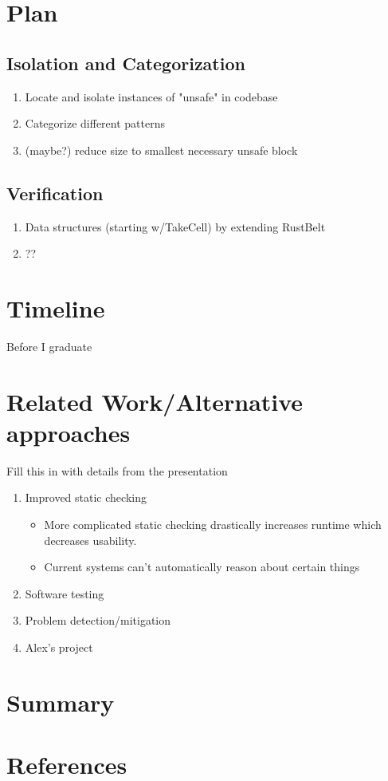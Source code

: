\documentclass[12pt]{article}
\begin{document}
\section{Plan}

\subsection{Isolation and Categorization}
\begin{enumerate}
    \item Locate and isolate instances of "unsafe" in codebase
    \item Categorize different patterns
    \item (maybe?) reduce size to smallest necessary unsafe block
\end{enumerate}

\subsection{Verification}
\begin{enumerate}
    \item Data structures (starting w/TakeCell) by extending RustBelt
    \item ??
\end{enumerate}

\section{Timeline}
Before I graduate

\section{Related Work/Alternative approaches}
Fill this in with details from the presentation
\begin{enumerate}
    \item Improved static checking
    \begin{itemize}
        \item More complicated static checking drastically increases runtime which decreases usability.
        \item Current systems can't automatically reason about certain things
    \end{itemize}
    
    \item Software testing
    
    \item Problem detection/mitigation
    
    \item Alex's project
    
\end{enumerate}

\section{Summary}

\section{References}
\end{document}
